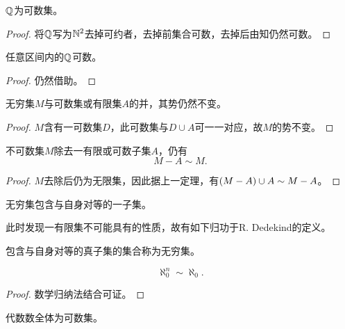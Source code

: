 \documentclass{ctexrep}
\begin{document}
  \begin{theorem}
    $\mathbb{Q}$为可数集。
  \end{theorem}
  \begin{proof}
    将$\mathbb{Q}$写为$\mathbb{N}^2$去掉可约者，去掉前集合可数，去掉后由知仍然可数。
  \end{proof}
  \begin{collary}
    任意区间内的$\mathbb{Q}$可数。
  \end{collary}
  \begin{proof}
    仍然借助。
  \end{proof}
  \begin{theorem}
    无穷集$M$与可数集或有限集$A$的并，其势仍然不变。
  \end{theorem}
  \begin{proof}
    $M$含有一可数集$D$，此可数集与$D \cup A$可一一对应，故$M$的势不变。
  \end{proof}
  \begin{theorem}
    不可数集$M$除去一有限或可数子集$A$，仍有
    \[ M-A \sim M. \]
  \end{theorem}
  \begin{proof}
    $M$去除后仍为无限集，因此据上一定理，有$\left(M-A\right) \cup A \sim M-A$。
  \end{proof}
  \begin{collary}
    无穷集包含与自身对等的一子集。
  \end{collary}
  \par
  此时发现一有限集不可能具有的性质，故有如下归功于R. Dedekind的定义。
  \begin{definition}
  	  包含与自身对等的真子集的集合称为无穷集。
  \end{definition}
  \begin{theorem}
    \[ \aleph_0^n \sim \aleph_0. \]
  \end{theorem}
  \begin{proof}
    数学归纳法结合可证。
  \end{proof}
  \begin{collary}
    代数数全体为可数集。
  \end{collary}
\end{document}
